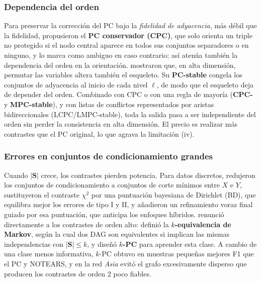 \subsubsection{Dependencia del orden}
Para preservar la corrección del PC bajo la \emph{fidelidad de adyacencia}, más débil que la fidelidad, \citet{ramsey2006adjacency} propusieron el \textbf{PC conservador (CPC)}, que solo orienta un triple no protegido si el nodo central aparece en todos sus conjuntos separadores o en ninguno, y lo marca como ambiguo en caso contrario; así atenúa también la dependencia del orden en la orientación. \citet{colombo2014order} mostraron que, en alta dimensión, permutar las variables altera también el esqueleto. Su \textbf{PC-stable} congela los conjuntos de adyacencia al inicio de cada nivel $\ell$, de modo que el esqueleto deja de depender del orden. Combinado con CPC o con una regla de mayoría (\textbf{CPC-} y \textbf{MPC-stable}), y con listas de conflictos representados por aristas bidireccionales (LCPC/LMPC-stable), toda la salida pasa a ser independiente del orden sin perder la consistencia en alta dimensión. El precio es realizar más contrastes que el PC original, lo que agrava la limitación (iv).

\subsubsection{Errores en conjuntos de condicionamiento grandes}
Cuando $|\mathbf{S}|$ crece, los contrastes pierden potencia. Para datos discretos, \citet{abellan2006variations} redujeron los conjuntos de condicionamiento a conjuntos de corte mínimos entre $X$ e $Y$, sustituyeron el contraste $\chi^2$ por una puntuación bayesiana de Dirichlet (BD), que equilibra mejor los errores de tipo I y II, y añadieron un refinamiento voraz final guiado por esa puntuación, que anticipa los enfoques híbridos. \citet{kocaoglu2023small} renunció directamente a los contrastes de orden alto: definió la \textbf{$k$-equivalencia de Markov}, según la cual dos DAG son equivalentes si implican las mismas independencias con $|\mathbf{S}| \le k$, y diseñó \textbf{$k$-PC} para aprender esta clase. A cambio de una clase menos informativa, $k$-PC obtuvo en muestras pequeñas mejores F1 que el PC y NOTEARS, y en la red \emph{Asia} evitó el grafo excesivamente disperso que producen los contrastes de orden 2 poco fiables.

